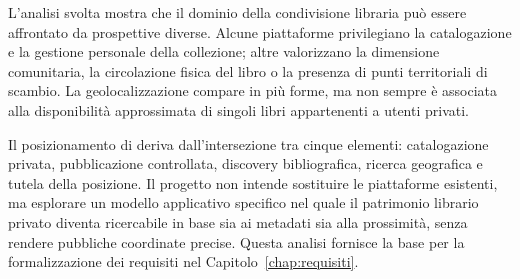 L'analisi svolta mostra che il dominio della condivisione libraria può essere affrontato da prospettive diverse. Alcune piattaforme privilegiano la catalogazione e la gestione personale della collezione; altre valorizzano la dimensione comunitaria, la circolazione fisica del libro o la presenza di punti territoriali di scambio. La geolocalizzazione compare in più forme, ma non sempre è associata alla disponibilità approssimata di singoli libri appartenenti a utenti privati.

Il posizionamento di \projectname{} deriva dall'intersezione tra cinque elementi: catalogazione privata, pubblicazione controllata, discovery bibliografica, ricerca geografica e tutela della posizione. Il progetto non intende sostituire le piattaforme esistenti, ma esplorare un modello applicativo specifico nel quale il patrimonio librario privato diventa ricercabile in base sia ai metadati sia alla prossimità, senza rendere pubbliche coordinate precise. Questa analisi fornisce la base per la formalizzazione dei requisiti nel Capitolo~\ref{chap:requisiti}.
